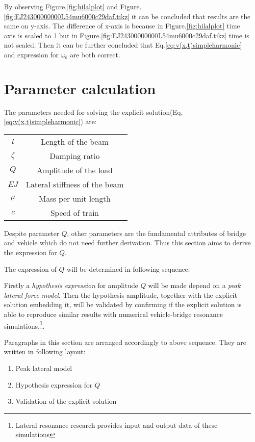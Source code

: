By observing Figure.\ref{fig:hilalplot} and Figure.\ref{fig:EJ24300000000L54mu6000c29daf.tikz} it can be concluded that results are the same on y-axis. The difference of x-axis is because in Figure.\ref{fig:hilalplot} time axis is scaled to 1 but in Figure.\ref{fig:EJ24300000000L54mu6000c29daf.tikz} time is not scaled. Then it can be further concluded that Eq.\ref{eq:v(x,t)simpleharmonic} and expression for $\omega_b$ are both correct.

\section{Parameter calculation}
The parameters needed for solving the explicit solution(Eq.\ref{eq:v(x,t)simpleharmonic}) are:

\begin{table}[h!]
	\centering
	\begin{tabular}{cc}
		\hline
		$l$ & Length of the beam \\ 
		$\zeta$ & Damping ratio \\
		$Q$ & Amplitude of the load \\
		$EJ$ & Lateral stiffness of the beam \\
		$\mu$ & Mass per unit length \\
		$c$ & Speed of train \\
		\hline
	\end{tabular}
\end{table}
	

Despite parameter $Q$, other parameters are the fundamental attributes of bridge and vehicle which do not need further derivation. Thus this section aims to derive the expression for $Q$.

The expression of $Q$ will be determined in following sequence:

Firstly a \emph{hypothesis expression} for amplitude $Q$ will be made depend on a \emph{peak lateral force model}. Then the hypothesis amplitude, together with the explicit solution embedding it, will be validated by confirming if the explicit solution is able to reproduce similar results with numerical vehicle-bridge resonance simulations.\footnote{Lateral resonance research\citep[Figure.C1,C2,...,C30]{d181dt329} provides input and output data of these simulations}.

Paragraphs in this section are arranged accordingly to above sequence. They are written in following layout:

\begin{enumerate}
	\item Peak lateral model
	\item Hypothesis expression for $Q$
	\item Validation of the explicit solution
\end{enumerate}

